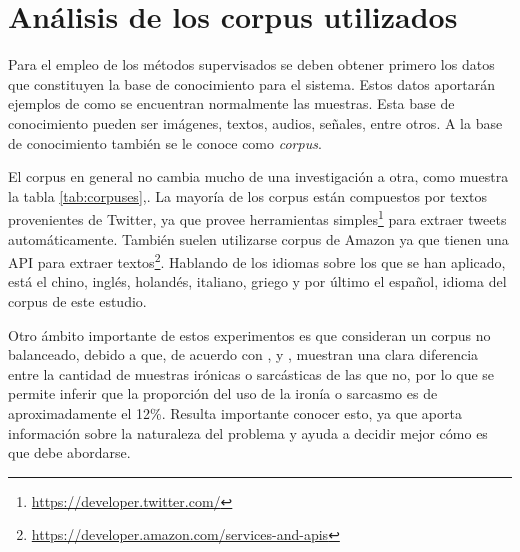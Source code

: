 \section{Análisis de los corpus utilizados}

\par Para el empleo de los métodos supervisados se deben obtener primero los datos que constituyen la base de conocimiento para el sistema. Estos datos aportarán ejemplos de como se encuentran normalmente las muestras. Esta base de conocimiento pueden ser imágenes, textos, audios, señales, entre otros. A la base de conocimiento también se le conoce como \textit{corpus}.

\par El corpus en general no cambia mucho de una investigación a otra, como muestra la tabla \ref{tab:corpuses},. La mayoría de los corpus están compuestos por textos provenientes de Twitter, ya que provee herramientas simples\footnote{\url{https://developer.twitter.com/}} para extraer tweets automáticamente. También suelen utilizarse corpus de Amazon ya que tienen una \gls{API} para extraer textos\footnote{ \url{https://developer.amazon.com/services-and-apis}}. Hablando de los idiomas sobre los que se han aplicado, está el chino, inglés, holandés, italiano, griego y por último el español, idioma del corpus de este estudio.

\par Otro ámbito importante de estos experimentos es que consideran un corpus no balanceado, debido a que, de acuerdo con \textcite{reyes2012making}, \textcite{lopez2016character} y \textcite{barbieri2014italian}, muestran una clara diferencia entre la cantidad de muestras irónicas o sarcásticas de las que no, por lo que se permite inferir que la proporción del uso de la ironía o sarcasmo es de aproximadamente el 12\%. Resulta importante conocer esto, ya que aporta información sobre la naturaleza del problema y ayuda a decidir mejor cómo es que debe abordarse.

